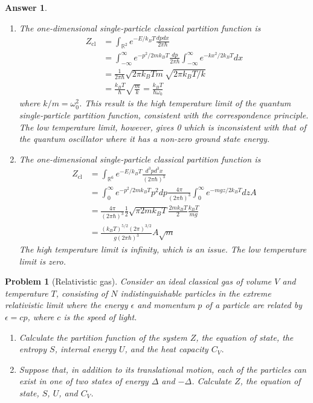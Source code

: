 \documentclass[a4paper]{article}
\theoremstyle{new2}
\newtheorem{ans}{Answer}[section]
\theoremstyle{new}
\newtheorem{qns}{Problem}[section]
\begin{document}
\begin{ans}\leavevmode
\begin{enumerate}[label=(\alph*)]
\item The one-dimensional single-particle classical partition function is
\begin{align}
    Z_{\text{cl}}&=\int_{\mathbb{R}^2} e^{-E/k_BT}\frac{dpdx}{2\pi\hbar}\nonumber\\&=\int_{-\infty}^\infty e^{-p^2/2mk_BT}\frac{dp}{2\pi\hbar}\int_{-\infty}^\infty e^{-kx^2/2k_BT}dx\nonumber\\&=\frac{1}{2\pi\hbar}\sqrt{2\pi k_BTm}\sqrt{2\pi k_BT/k}\nonumber\\&=\frac{k_BT}{\hbar}\sqrt{\frac{m}{k}}=\frac{k_BT}{\hbar\omega_0}\nonumber
\end{align}
where $k/m=\omega_0^2$. This result is the high temperature limit of the quantum single-particle partition function, consistent with the correspondence principle. The low temperature limit, however, gives 0 which is inconsistent with that of the quantum oscillator where it has a non-zero ground state energy.
\item The one-dimensional single-particle classical partition function is
\begin{align}
    Z_{\text{cl}}&=\int_{\mathbb{R}^6} e^{-E/k_BT}\frac{d^3pd^3x}{(2\pi\hbar)^3}\nonumber\\&=\int_{0}^\infty e^{-p^2/2mk_BT}p^2dp\frac{4\pi}{(2\pi\hbar)^3}\int_{0}^\infty e^{-mgz/2k_BT}dzA\nonumber\\&=\frac{4\pi}{(2\pi\hbar)^3}\frac{1}{2}\sqrt{\pi2mk_BT}\frac{2mk_BT}{2}\frac{k_BT}{mg}\nonumber\\&=\frac{(k_BT)^{5/2}(2\pi)^{3/2}}{g(2\pi\hbar)^3}A\sqrt{m}\nonumber
\end{align}
The high temperature limit is infinity, which is an issue. The low temperature limit is zero.
\end{enumerate}
\end{ans}
\newpage
\begin{qns}[Relativistic gas]
Consider an ideal classical gas of volume $V$ and temperature $T$, consisting of $N$ indistinguishable particles in the extreme relativistic limit where the energy $\epsilon$ and momentum $p$ of a particle are related by $\epsilon= cp$, where $c$ is the speed of light.
\begin{enumerate}[label=(\alph*)]
\item Calculate the partition function of the system $Z$, the equation of state, the entropy $S$, internal energy $U$, and the heat capacity $C_V$.
\item Suppose that, in addition to its translational motion, each of the particles can exist in one of two states of energy $\Delta$ and $-\Delta$. Calculate $Z$, the equation of state, $S$, $U$, and $C_V$.
\end{enumerate}
\end{qns}
\end{document}
